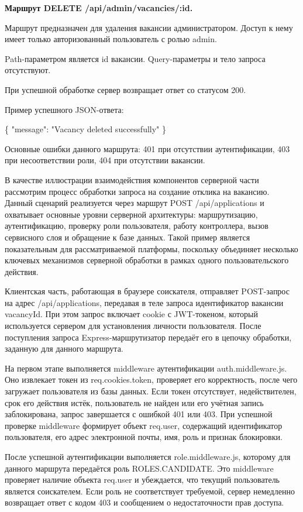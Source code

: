 \textbf{Маршрут DELETE /api/admin/vacancies/:id.}

Маршрут предназначен для удаления вакансии администратором. Доступ к нему имеет только авторизованный пользователь с ролью admin.

Path-параметром является id вакансии. Query-параметры и тело запроса отсутствуют.

При успешной обработке сервер возвращает ответ со статусом 200.

Пример успешного JSON-ответа:

\begin{flushleft}
	\small\ttfamily
	\{ "message": "Vacancy deleted successfully" \}
\end{flushleft}

Основные ошибки данного маршрута: 401 при отсутствии аутентификации, 403 при несоответствии роли, 404 при отсутствии вакансии.

В качестве иллюстрации взаимодействия компонентов серверной части рассмотрим процесс обработки запроса на создание отклика на вакансию. Данный сценарий реализуется через маршрут POST /api/applications и охватывает основные уровни серверной архитектуры: маршрутизацию, аутентификацию, проверку роли пользователя, работу контроллера, вызов сервисного слоя и обращение к базе данных. Такой пример является показательным для рассматриваемой платформы, поскольку объединяет несколько ключевых механизмов серверной обработки в рамках одного пользовательского действия.

Клиентская часть, работающая в браузере соискателя, отправляет POST-запрос на адрес /api/applications, передавая в теле запроса идентификатор вакансии vacancyId. При этом запрос включает cookie с JWT-токеном, который используется сервером для установления личности пользователя. После поступления запроса Express-маршрутизатор передаёт его в цепочку обработки, заданную для данного маршрута.

На первом этапе выполняется middleware аутентификации auth.middleware.js. Оно извлекает токен из req.cookies.token, проверяет его корректность, после чего загружает пользователя из базы данных. Если токен отсутствует, недействителен, срок его действия истёк, пользователь не найден или его учётная запись заблокирована, запрос завершается с ошибкой 401 или 403. При успешной проверке middleware формирует объект req.user, содержащий идентификатор пользователя, его адрес электронной почты, имя, роль и признак блокировки.

После успешной аутентификации выполняется role.middleware.js, которому для данного маршрута передаётся роль ROLES.CANDIDATE. Это middleware проверяет наличие объекта req.user и убеждается, что текущий пользователь является соискателем. Если роль не соответствует требуемой, сервер немедленно возвращает ответ с кодом 403 и сообщением о недостаточности прав доступа.

